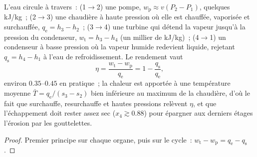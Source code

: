 \begin{proposition}\label{prop:b2:open-systems:rankine}
L'eau circule à travers~: (1$\to$2) une pompe, $w_{\text{p}} \approx v(P_2 -
P_1)$, quelques \unit{kJ/kg}~; (2$\to$3) une chaudière à haute pression où elle
est chauffée, vaporisée et surchauffée, $q_{\text{e}} = h_3 - h_2$~;
(3$\to$4) une turbine qui détend la vapeur jusqu'à la pression du condenseur,
$w_{\text{t}} = h_3 - h_4$ (un millier de \unit{kJ/kg})~; (4$\to$1) un condenseur
à basse pression où la vapeur humide redevient liquide, rejetant
$q_{\text{s}} = h_4 - h_1$ à l'eau de refroidissement. Le rendement vaut
\[
\eta = \frac{w_{\text{t}} - w_{\text{p}}}{q_{\text{e}}} = 1 - \frac{q_{\text{s}}}{q_{\text{e}}} ,
\]
environ $0.35$--$0.45$ en pratique~; la chaleur est apportée à une température
moyenne $\bar T = q_{\text{e}}/(s_3 - s_2)$ bien inférieure au maximum de la
chaudière, d'où le fait que surchauffe, resurchauffe et hautes pressions relèvent
$\eta$, et que l'échappement doit rester assez sec ($x_4 \gtrsim 0.88$) pour
épargner aux derniers étages l'érosion par les gouttelettes.
\end{proposition}

\begin{proof}
Premier principe sur chaque organe, puis sur le cycle~: $w_{\text{t}} - w_{\text{p}}
= q_{\text{e}} - q_{\text{s}}$.
\end{proof}

